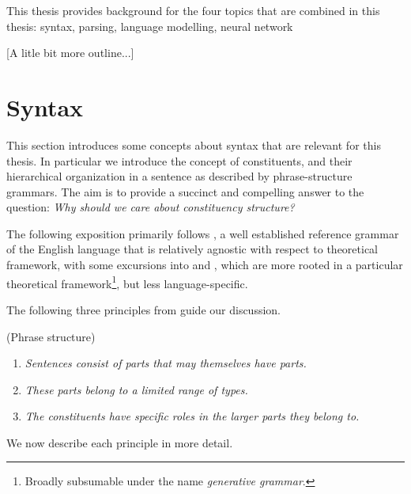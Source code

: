 % 

This thesis provides background for the four topics that are combined in this thesis: syntax, parsing, language modelling, neural network

[A litle bit more outline...]

\section{Syntax}
This section introduces some concepts about syntax that are relevant for this thesis. In particular we introduce the concept of constituents, and their hierarchical organization in a sentence as described by phrase-structure grammars. The aim is to provide a succinct and compelling answer to the question: \textit{Why should we care about constituency structure?}

The following exposition primarily follows \citet{huddleston2002grammar}, a well established reference grammar of the English language that is relatively agnostic with respect to theoretical framework, with some excursions into \citet{carnie2010constituent} and \citet{everaert2015structures}, which are more rooted in a particular theoretical framework\footnote{Broadly subsumable under the name \textit{generative grammar}.}, but less language-specific.

The following three principles from \citet{huddleston2002grammar} guide our discussion.
\begin{definition}{(Phrase structure) }
  \begin{enumerate}
    \item \textit{Sentences consist of parts that may themselves have parts.}
    \item \textit{These parts belong to a limited range of types.}
    \item \textit{The constituents have specific roles in the larger parts they belong to.}
  \end{enumerate}
\end{definition}
We now describe each principle in more detail.

